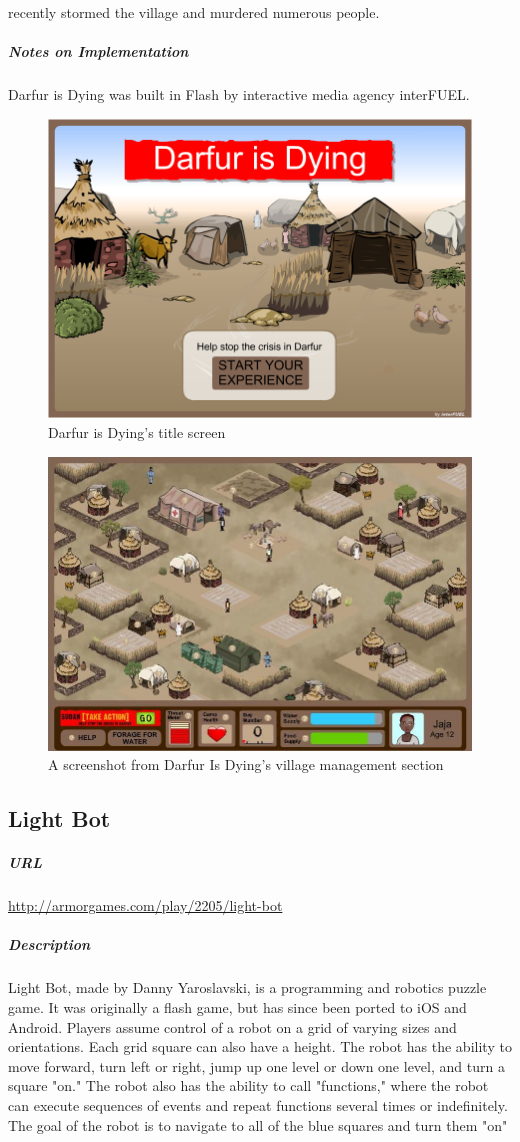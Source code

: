 recently stormed the village and murdered numerous people.\subparagraph{Notes on Implementation}Darfur is Dying was built in Flash by interactive media agency interFUEL.\newpage\begin{figure}[h!]\centering \includegraphics[height=0.33\textheight]{img/darfur_title.png}\caption{Darfur is Dying's title screen}\end{figure}\begin{figure}[h!]\centering \includegraphics[height=0.33\textheight]{img/darfur_screen1.jpg}\caption{A screenshot from Darfur Is Dying's village management section}\end{figure}\subsection{Light Bot}\subparagraph{URL}\url{http://armorgames.com/play/2205/light-bot}\subparagraph{Description}Light Bot, made by Danny Yaroslavski, is a programming and robotics puzzle game. It was originally a flash game, but has since been ported to iOS and Android. Players assume control of a robot on a grid of varying sizes and orientations. Each grid square can also have a height. The robot has the ability to move forward, turn left or right, jump up one level or down one level, and turn a square "on." The robot also has the ability to call "functions," where the robot can execute sequences of events and repeat functions several times or indefinitely. The goal of the robot is to navigate to all of the blue squares and turn them "on" 